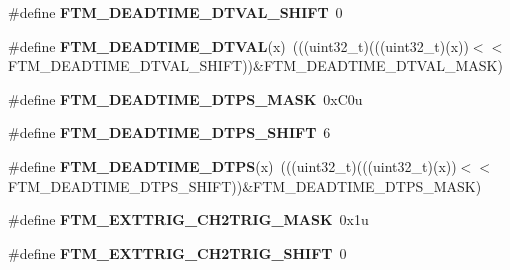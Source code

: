 \begin{DoxyCompactItemize}
\item 
\#define {\bfseries F\+T\+M\+\_\+\+D\+E\+A\+D\+T\+I\+M\+E\+\_\+\+D\+T\+V\+A\+L\+\_\+\+S\+H\+I\+FT}~0\hypertarget{group__FTM__Register__Masks_ga40e02c81ec12ef23c0ce633feaf03d1a}{}\label{group__FTM__Register__Masks_ga40e02c81ec12ef23c0ce633feaf03d1a}

\item 
\#define {\bfseries F\+T\+M\+\_\+\+D\+E\+A\+D\+T\+I\+M\+E\+\_\+\+D\+T\+V\+AL}(x)~(((uint32\+\_\+t)(((uint32\+\_\+t)(x))$<$$<$F\+T\+M\+\_\+\+D\+E\+A\+D\+T\+I\+M\+E\+\_\+\+D\+T\+V\+A\+L\+\_\+\+S\+H\+I\+FT))\&F\+T\+M\+\_\+\+D\+E\+A\+D\+T\+I\+M\+E\+\_\+\+D\+T\+V\+A\+L\+\_\+\+M\+A\+SK)\hypertarget{group__FTM__Register__Masks_ga3a313efb41a03923ef2e16146fb31ab2}{}\label{group__FTM__Register__Masks_ga3a313efb41a03923ef2e16146fb31ab2}

\item 
\#define {\bfseries F\+T\+M\+\_\+\+D\+E\+A\+D\+T\+I\+M\+E\+\_\+\+D\+T\+P\+S\+\_\+\+M\+A\+SK}~0x\+C0u\hypertarget{group__FTM__Register__Masks_gae0402be742f84b93af5306ac6a61706f}{}\label{group__FTM__Register__Masks_gae0402be742f84b93af5306ac6a61706f}

\item 
\#define {\bfseries F\+T\+M\+\_\+\+D\+E\+A\+D\+T\+I\+M\+E\+\_\+\+D\+T\+P\+S\+\_\+\+S\+H\+I\+FT}~6\hypertarget{group__FTM__Register__Masks_gaa42cc1f2612186f882762059b910cd7a}{}\label{group__FTM__Register__Masks_gaa42cc1f2612186f882762059b910cd7a}

\item 
\#define {\bfseries F\+T\+M\+\_\+\+D\+E\+A\+D\+T\+I\+M\+E\+\_\+\+D\+T\+PS}(x)~(((uint32\+\_\+t)(((uint32\+\_\+t)(x))$<$$<$F\+T\+M\+\_\+\+D\+E\+A\+D\+T\+I\+M\+E\+\_\+\+D\+T\+P\+S\+\_\+\+S\+H\+I\+FT))\&F\+T\+M\+\_\+\+D\+E\+A\+D\+T\+I\+M\+E\+\_\+\+D\+T\+P\+S\+\_\+\+M\+A\+SK)\hypertarget{group__FTM__Register__Masks_gaf1a7c61f4e08ca45f70154070500695d}{}\label{group__FTM__Register__Masks_gaf1a7c61f4e08ca45f70154070500695d}

\item 
\#define {\bfseries F\+T\+M\+\_\+\+E\+X\+T\+T\+R\+I\+G\+\_\+\+C\+H2\+T\+R\+I\+G\+\_\+\+M\+A\+SK}~0x1u\hypertarget{group__FTM__Register__Masks_ga156b1af5902f975c8d6b667e77ce11da}{}\label{group__FTM__Register__Masks_ga156b1af5902f975c8d6b667e77ce11da}

\item 
\#define {\bfseries F\+T\+M\+\_\+\+E\+X\+T\+T\+R\+I\+G\+\_\+\+C\+H2\+T\+R\+I\+G\+\_\+\+S\+H\+I\+FT}~0\hypertarget{group__FTM__Register__Masks_ga6bd01126a4e39a0ccf9446da55a86c53}{}\label{group__FTM__Register__Masks_ga6bd01126a4e39a0ccf9446da55a86c53}


\end{DoxyCompactItemize}

